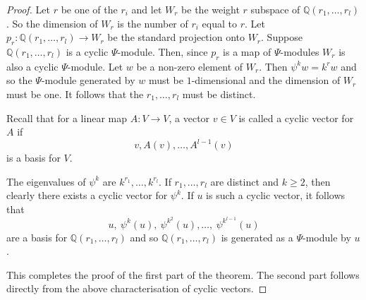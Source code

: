 \documentclass[10pt,a4paper]{amsart}
\newcommand{\Q}{\mathbb{Q}}
\begin{document}
\begin{proof} 
Let $r$ be one of the $r_i$ and let $W_r$ be the weight $r$ subspace of $\Q(r_1, \dots, r_l)$.  So the dimension of $W_r$ is the number of $r_i$ equal to $r$.  Let $p_r : \Q(r_1, \dots, r_l) \to W_r$ be the standard projection onto $W_r$.  Suppose $\Q(r_1, \dots, r_l)$ is a cyclic $\Psi$-module. Then, since $p_r$ is a map of $\Psi$-modules $W_r$ is also a cyclic $\Psi$-module.  Let $w$ be a non-zero element of $W_r$.  Then $\psi^kw = k^rw$ and so the $\Psi$-module generated by $w$ must be $1$-dimensional and the dimension of $W_r$ must be one.  It follows that the $r_1, \dots, r_l$ must be distinct.  



Recall that for a linear map $A : V \to V$, a vector $v \in V$ is called a cyclic vector for $A$ if 
$$
v, A(v), \dots, A^{l-1}(v)
$$
is a basis for $V$. 
 
The eigenvalues of $\psi^k$ are $k^{r_1}, \dots, k^{r_l}$.  If $r_1, \dots, r_l$ are distinct
and $k\geq 2$, 
then clearly %
there exists a cyclic vector for $\psi^k$. If $u$ is such a cyclic vector, it follows that
$$
u, \ \psi^k(u), \ \psi^{k^2}(u), \ldots, \ \psi^{k^{l-1}}(u)
$$ 
are a basis for $\Q(r_1, \dots, r_l)$ and so $\Q(r_1, \dots, r_l)$ is generated as a $\Psi$-module by $u$.

This completes the proof of the first part of the theorem. The second part follows directly from the above characterisation of cyclic vectors.
\end{proof}
\end{document}
